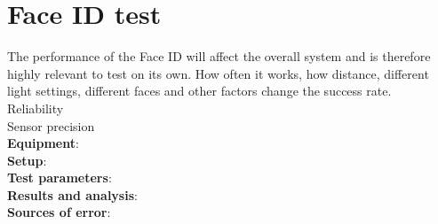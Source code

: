 \section{Face ID test}
The performance of the Face ID will affect the overall system and is therefore highly relevant to test on its own. How often it works, how distance, different light settings, different faces and other factors change the success rate.\\
Reliability\\
Sensor precision\\


\textbf{Equipment}:
\\
\textbf{Setup}:
\\
\textbf{Test parameters}:
\\
\textbf{Results and analysis}:
\\
\textbf{Sources of error}: